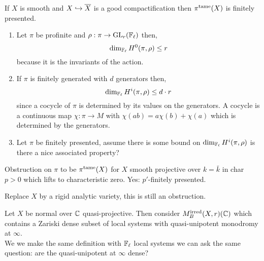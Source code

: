 \documentclass[12pt]{article}
\begin{document}
\begin{cor}
If $X$ is smooth and $X \hookrightarrow \overline{X}$ is a good compactification then $\pi^{\mathrm{tame}}(X)$ is finitely presented.
\end{cor}

\begin{enumerate}
\item Let $\pi$ be profinite and $\rho : \pi \to \mathrm{GL}_r(\mathbb{F}_\ell)$ then,
\[ \dim_{\mathbb{F}_\ell} H^0(\pi, \rho) \le r \]
because it is the invariants of the action. 

\item If $\pi$ is finitely generated with $d$ generators then,
\[ \dim_{\mathbb{F}_\ell} H^i(\pi, \rho) \le d \cdot r \]
since a cocycle of $\pi$ is determined by its values on the generators. A cocycle is a continuous map $\chi : \pi \to M$ with $\chi(ab) = a \chi(b) + \chi(a)$ which is determined by the generators.

\item Let $\pi$ be finitely presented, assume there is some bound on $\dim_{\mathbb{F}_\ell} H^i(\pi, \rho)$ is there a nice associated property? 
\end{enumerate}

Obstruction on $\pi$ to be $\pi^{\mathrm{tame}}(X)$ for $X$ smooth projective over $k = \bar{k}$ in char $p > 0$ which lifts to characteristic zero. Yes: $p'$-finitely presented. 

\begin{conj}
Replace $X$ by a rigid analytic variety, this is still an obstruction.
\end{conj}

Let $X$ be normal over $\mathbb{C}$ quasi-projective. Then consider $M_B^{\text{irred}}(X, r)(\mathbb{C})$ which contains a Zariski dense subset of local systems with quasi-unipotent monodromy at $\infty$. 
\bigskip\\
We we make the same definition with $\mathbb{F}_\ell$ local systems we can ask the same question: are the quasi-unipotent at $\infty$ dense? 
\end{document}

